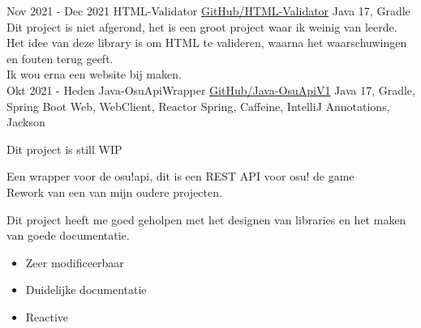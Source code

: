 \documentclass[letterpaper]{twentysecondcv} %
\begin{document}
    \begin{twenty} %
        \twentyitem
        {Nov 2021 -}
        {Dec 2021}
        {HTML-Validator}
        {\href{https://github.com/Tais993/HTML-Validator/}{GitHub/HTML-Validator}}
        {Java 17, Gradle}
        {
            Dit project is niet afgerond, het is een groot project waar ik weinig van leerde.\\

        Het idee van deze library is om HTML te valideren, waarna het waarschuwingen en fouten terug geeft.\\
        Ik wou erna een website bij maken.}\\

        \twentyitem
        {Okt 2021 -}
        {Heden}
        {Java-OsuApiWrapper}
        {\href{https://github.com/Tais993/Java-OsuApiV1/}{GitHub/Java-OsuApiV1}}
        {Java 17, Gradle, Spring Boot Web, WebClient, Reactor Spring, Caffeine, IntelliJ Annotations, Jackson}
        {
            Dit project is still WIP

            Een wrapper voor de osu!api, dit is een REST API voor osu! de game\\
        Rework van een van mijn oudere projecten.

        Dit project heeft me goed geholpen met het designen van libraries en het maken van goede documentatie.
            \begin{itemize}
                \item Zeer modificeerbaar
                \item Duidelijke documentatie
                \item Reactive
            \end{itemize}}\\
    \end{twenty}

    \newpage

    \makesidebarSecond %

\end{document}
